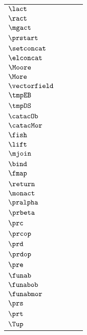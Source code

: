 \begin{longtable}{lllr}
 $\lact$ &  &  & \\ 
 $\ract$ &  &  & \\ 
 $\mgact$ &  &  & \\ 
 $\prstart$ &  &  & \\ 
 $\setconcat$ &  &  & \\ 
 $\elconcat$ &  &  & \\ 
 $\Moore$ &  &  & \\ 
 $\More$ &  &  & \\ 
 $\vectorfield$ &  &  & \\ 
 $\tmpEB$ &  &  & \\ 
 $\tmpDS$ &  &  & \\ 
 $\catacOb$ &  &  & \\ 
 $\catacMor$ &  &  & \\ 
 $\fish$ &  &  & \\ 
 $\lift$ &  &  & \\ 
 $\mjoin$ &  &  & \\ 
 $\bind$ &  &  & \\ 
 $\fmap$ &  &  & \\ 
 $\return$ &  &  & \\ 
 $\monact$ &  &  & \\ 
 $\pralpha$ &  &  & \\ 
 $\prbeta$ &  &  & \\ 
 $\prc$ &  &  & \\ 
 $\prcop$ &  &  & \\ 
 $\prd$ &  &  & \\ 
 $\prdop$ &  &  & \\ 
 $\pre$ &  &  & \\ 
 $\funab$ &  &  & \\ 
 $\funabob$ &  &  & \\ 
 $\funabmor$ &  &  & \\ 
 $\prs$ &  &  & \\ 
 $\prt$ &  &  & \\ 
 $\Tup$ &  &  & \\ 
 \end{longtable}
